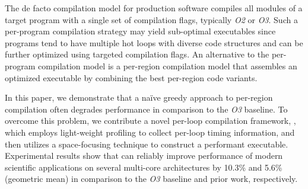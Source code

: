 The de facto compilation model for production software compiles all
modules of a target program with a single set of compilation flags,
typically \emph{O2} or \emph{O3}. Such a per-program compilation
strategy may yield sub-optimal executables since programs tend to have
multiple hot loops with diverse code structures and can be further
optimized using targeted compilation flags. An alternative to the
per-program compilation model is a per-region compilation model that
assembles an optimized executable by combining the best per-region code variants.

In this paper, we demonstrate that a na\"ive greedy approach to per-region
compilation often degrades performance in comparison to the \emph{O3} baseline.
To overcome this problem, we contribute a novel per-loop compilation framework,
\toolname, which employs light-weight profiling to collect per-loop
timing information, and then utilizes a space-focusing technique to construct a
performant executable. Experimental results show that \toolname can reliably
improve performance of modern scientific applications on several
multi-core architectures by 10.3\% and 5.6\% (geometric mean) in
comparison to the \emph{O3} baseline and prior work, respectively.